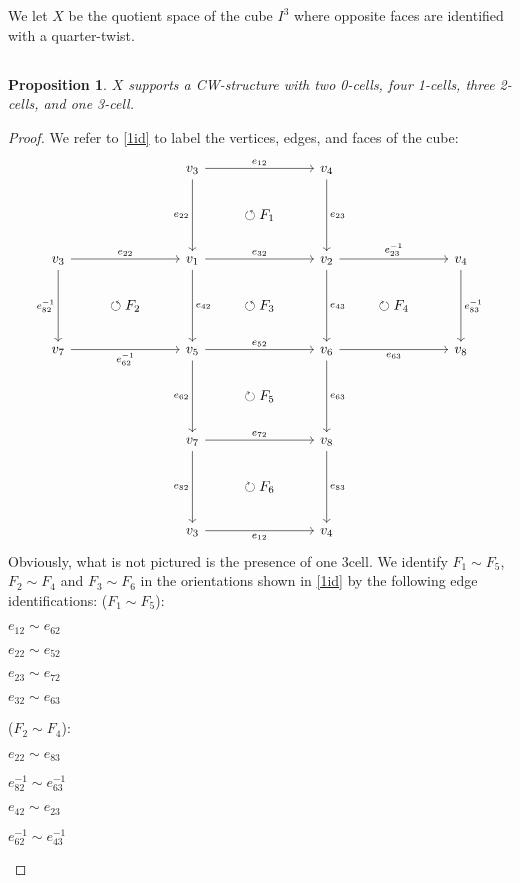 \documentclass[english]{article}
\newcommand{\prob}[1]{\setcounter{section}{#1-1}\section{}}
\newcommand{\prt}[1]{\setcounter{subsection}{#1-1}\subsection{}}
\newtheorem*{proposition*}{Proposition}
\theoremstyle{remark}
\theoremstyle{definition}
\begin{document}
\prob{4} We let $X$ be the quotient space of the cube $I^3$ where opposite faces are identified with a quarter-twist.
\prt{1}
\begin{proposition*}
	$X$ supports a CW-structure with two 0-cells, four 1-cells, three 2-cells, and one 3-cell.
\end{proposition*}
\begin{proof}
	We refer to \eqref{1id} to label the vertices, edges, and faces of the cube:
	\begin{equation}
	\begin{tikzcd}[column sep=normal]
	&&v_{3}\arrow[dd,"e_{22}",swap]\arrow[rr,"e_{12}"]		&&v_{4}\arrow[dd,"e_{23}"]		&&\\
	&&&		\circlearrowleft F_1&&&\\
	v_{3}\arrow[dd,"e_{82}^{-1}",swap]\arrow[rr,"e_{22}"]
	&&v_{1}\arrow[dd,"e_{42}"]\arrow[rr,"e_{32}"]&&v_{2}	\arrow[dd,"e_{43}"]\arrow[rr,"e_{23}^{-1}"]	&&v_{4}\arrow[dd,"e_{83}^{-1}"]\\
	&	\circlearrowleft F_2	&&	\circlearrowleft F_3	&&\circlearrowright	F_4	&\\
	v_{7}\arrow[rr,"e_{62}^{-1}",swap]	&&v_{5}	\arrow[dd,"e_{62}",swap]\arrow[rr,"e_{52}"]	&&v_{6}\arrow[dd,"e_{63}"]\arrow[rr,"e_{63}",swap]		&&v_{8}\\
	&&&	\circlearrowright F_5	&&&\\
	&&v_{7}\arrow[dd,"e_{82}",swap]\arrow[rr,"e_{72}"]		&&v_{8}\arrow[dd,"e_{83}"]	&&\\
	&&&	\circlearrowright F_6	&&&\\
	&&v_{3}\arrow[rr,"e_{12}",swap]		&&v_{4}		&&	
	\end{tikzcd}\label{1id}
	\end{equation}
	Obviously, what is not pictured is the presence of one 3cell. We identify $F_1\sim F_5$, $F_2\sim F_4$ and $F_3\sim F_6$ in the orientations shown in \eqref{1id} by the following edge identifications:\newline
	($F_1\sim F_5$): \begin{itemize*}
		\item $e_{12}\sim e_{62}$ \item $e_{22}\sim e_{52}$ \item $e_{23}\sim e_{72}$ \item $e_{32}\sim e_{63}$
	\end{itemize*}\newline	
	($F_2\sim F_4$): \begin{itemize*}
		\item $e_{22}\sim e_{83}$ \item $e_{82}^{-1}\sim e_{63}^{-1}$ \item $e_{42}\sim e_{23}$ \item $e_{62}^{-1}\sim e_{43}^{-1}$

\end{itemize*}
\end{proof}
\end{document}
